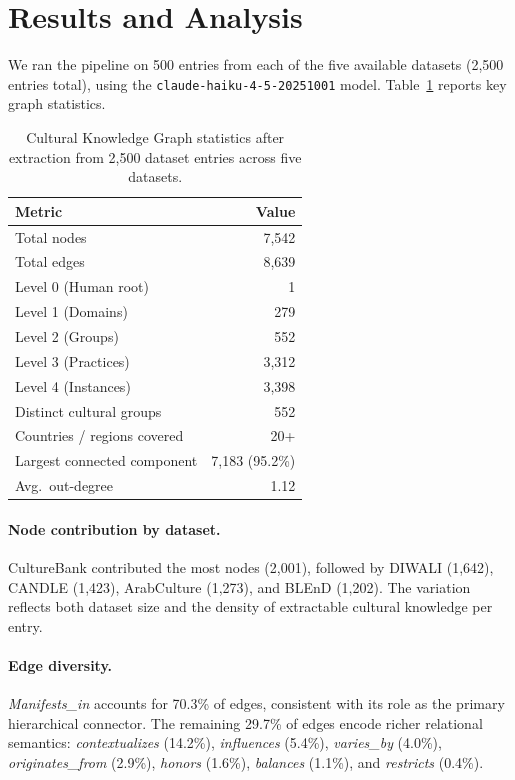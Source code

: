\documentclass[11pt]{article}
\begin{document}
\section{Results and Analysis}
\label{sec:results}

We ran the pipeline on 500 entries from each of the five available
datasets (2,500 entries total), using the
\texttt{claude-haiku-4-5-20251001} model.
Table~\ref{tab:results} reports key graph statistics.

\begin{table}[h]
\centering
\small
\begin{tabular}{lr}
\toprule
\textbf{Metric} & \textbf{Value} \\
\midrule
Total nodes             & 7,542 \\
Total edges             & 8,639 \\
Level 0 (Human root)    & 1 \\
Level 1 (Domains)       & 279 \\
Level 2 (Groups)        & 552 \\
Level 3 (Practices)     & 3,312 \\
Level 4 (Instances)     & 3,398 \\
\midrule
Distinct cultural groups & 552 \\
Countries / regions covered & 20+ \\
Largest connected component & 7,183 (95.2\%) \\
Avg.\ out-degree        & 1.12 \\
\bottomrule
\end{tabular}
\caption{Cultural Knowledge Graph statistics after extraction
from 2,500 dataset entries across five datasets.}
\label{tab:results}
\end{table}

\paragraph{Node contribution by dataset.}
CultureBank contributed the most nodes (2,001), followed by DIWALI
(1,642), CANDLE (1,423), ArabCulture (1,273), and BLEnD (1,202).
The variation reflects both dataset size and the density of extractable
cultural knowledge per entry.

\paragraph{Edge diversity.}
\emph{Manifests\_in} accounts for 70.3\% of edges, consistent with its
role as the primary hierarchical connector.
The remaining 29.7\% of edges encode richer relational semantics:
\emph{contextualizes} (14.2\%), \emph{influences} (5.4\%),
\emph{varies\_by} (4.0\%), \emph{originates\_from} (2.9\%),
\emph{honors} (1.6\%), \emph{balances} (1.1\%), and
\emph{restricts} (0.4\%).
\end{document}
